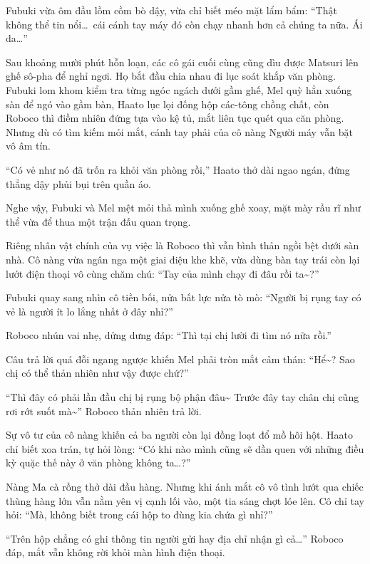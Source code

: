 \documentclass[../main.tex]{subfiles}
\begin{document}
Fubuki vừa ôm đầu lồm cồm bò dậy, vừa chỉ biết méo mặt lẩm bẩm: ``Thật không thể tin nổi\dots\ cái cánh tay máy đó còn chạy nhanh hơn cả chúng ta nữa. Ái da\dots''

\ct

Sau khoảng mười phút hỗn loạn, các cô gái cuối cùng cũng dìu được Matsuri lên ghế sô-pha để nghỉ ngơi. Họ bắt đầu chia nhau đi lục soát khắp văn phòng. Fubuki lom khom kiểm tra từng ngóc ngách dưới gầm ghế, Mel quỳ hẳn xuống sàn để ngó vào gầm bàn, Haato lục lọi đống hộp các-tông chồng chất, còn Roboco thì điềm nhiên đứng tựa vào kệ tủ, mắt liên tục quét qua căn phòng. Nhưng dù có tìm kiếm mỏi mắt, cánh tay phải của cô nàng Người máy vẫn bặt vô âm tín.

``Có vẻ như nó đã trốn ra khỏi văn phòng rồi,'' Haato thở dài ngao ngán, đứng thẳng dậy phủi bụi trên quần áo.

Nghe vậy, Fubuki và Mel mệt mỏi thả mình xuống ghế xoay, mặt mày rầu rĩ như thể vừa để thua một trận đấu quan trọng.

Riêng nhân vật chính của vụ việc là Roboco thì vẫn bình thản ngồi bệt dưới sàn nhà. Cô nàng vừa ngân nga một giai điệu khe khẽ, vừa dùng bàn tay trái còn lại lướt điện thoại vô cùng chăm chú: ``Tay của mình chạy đi đâu rồi ta\~{}?''

Fubuki quay sang nhìn cô tiền bối, nửa bất lực nửa tò mò: ``Người bị rụng tay có vẻ là người ít lo lắng nhất ở đây nhỉ?''

Roboco nhún vai nhẹ, dửng dưng đáp: ``Thì tại chị lười đi tìm nó nữa rồi.''

Câu trả lời quá đỗi ngang ngược khiến Mel phải tròn mắt cảm thán: ``Hể\~{}? Sao chị có thể thản nhiên như vậy được chứ?''

``Thì đây có phải lần đầu chị bị rụng bộ phận đâu\~{} Trước đây tay chân chị cũng rơi rớt suốt mà\~{}'' Roboco thản nhiên trả lời.

Sự vô tư của cô nàng khiến cả ba người còn lại đồng loạt đổ mồ hôi hột. Haato chỉ biết xoa trán, tự hỏi lòng: ``Có khi nào mình cũng sẽ dần quen với những điều kỳ quặc thế này ở văn phòng không ta\dots?''

Nàng Ma cà rồng thở dài đầu hàng. Nhưng khi ánh mắt cô vô tình lướt qua chiếc thùng hàng lớn vẫn nằm yên vị cạnh lối vào, một tia sáng chợt lóe lên. Cô chỉ tay hỏi: ``Mà, không biết trong cái hộp to đùng kia chứa gì nhỉ?''


``Trên hộp chẳng có ghi thông tin người gửi hay địa chỉ nhận gì cả\dots'' Roboco đáp, mắt vẫn không rời khỏi màn hình điện thoại.
\end{document}
